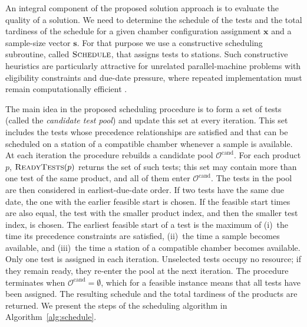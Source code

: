 \documentclass[11pt]{article}
\begin{document}
An integral component of the proposed solution approach is to evaluate the quality of a solution. We need to determine the schedule of the tests and the total tardiness of the schedule for a given chamber configuration assignment \(\mathbf{x}\) and a sample-size vector \(\mathbf{s}\). For that purpose we use a constructive scheduling subroutine, called \(\textsc{Schedule}{}\), that assigns tests to stations. Such constructive heuristics are particularly attractive for unrelated parallel-machine problems with eligibility constraints and due-date pressure, where repeated implementation must remain computationally efficient \citep{PerezGonzalezFernandezViagasZamoraGarciaFraminan2019,WangHeKerkhoveVanhoucke2017}.

The main idea in the proposed scheduling procedure is to form a set of tests (called the \emph{candidate test pool}) and update this set at every iteration. This set includes the tests whose precedence relationships are satisfied and that can be scheduled on a station of a compatible chamber whenever a sample is available. At each iteration the procedure rebuilds a candidate pool \(\mathcal{O}^{\mathrm{cand}}\). For each product \(p\), \(\textsc{ReadyTests}(p)\) returns the set of such tests; this set may contain more than one test of the same product, and all of them enter \(\mathcal{O}^{\mathrm{cand}}\). The tests in the pool are then considered in earliest-due-date order. If two tests have the same due date, the one with the earlier feasible start is chosen. If the feasible start times are also equal, the test with the smaller product index, and then the smaller test index, is chosen. The earliest feasible start of a test is the maximum of (i)~the time its precedence constraints are satisfied, (ii)~the time a sample becomes available, and (iii)~the time a station of a compatible chamber becomes available. Only one test is assigned in each iteration. Unselected tests occupy no resource; if they remain ready, they re-enter the pool at the next iteration. The procedure terminates when \(\mathcal{O}^{\mathrm{cand}}=\emptyset\), which for a feasible instance means that all tests have been assigned. The resulting schedule and the total tardiness of the products are returned. We present the steps of the scheduling algorithm in Algorithm~\ref{alg:schedule}.
\end{document}
